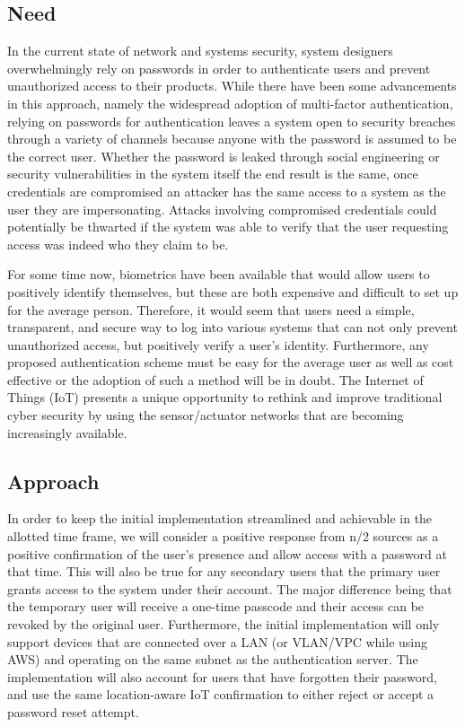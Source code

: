 \documentclass[11pt,journal]{IEEEtran}
\begin{document}
\subsection{Need}
In the current state of network and systems security, system designers overwhelmingly rely on passwords in order to authenticate users and prevent unauthorized access to their products.  While there have been some advancements in this approach, namely the widespread adoption of multi-factor authentication, relying on passwords for authentication leaves a system open to security breaches through a variety of channels because anyone with the password is assumed to be the correct user.  Whether the password is leaked through social engineering or security vulnerabilities in the system itself the end result is the same, once credentials are compromised an attacker has the same access to a system as the user they are impersonating.  Attacks involving compromised credentials could potentially be thwarted if the system was able to verify that the user requesting access was indeed who they claim to be.

For some time now, biometrics have been available that would allow users to positively identify themselves, but these are both expensive and difficult to set up for the average person.  
Therefore, it would seem that users need a simple, transparent, and secure way to log into various systems that can not only prevent unauthorized access, but positively verify a user’s identity.  Furthermore, any proposed authentication scheme must be easy for the average user as well as cost effective or the adoption of such a method will be in doubt.  The Internet of Things (IoT) presents a unique opportunity to rethink and improve traditional cyber security by using the sensor/actuator networks that are becoming increasingly available.

\subsection{Approach}
In order to keep the initial implementation streamlined and achievable in the allotted time frame, we will consider a positive response from n/2 sources as a positive confirmation of the user’s presence and allow access with a password at that time.   This will also be true for any secondary users that the primary user grants access to the system under their account.  The major difference being that the temporary user will receive a one-time passcode and their access can be revoked by the original user.  Furthermore, the initial implementation will only support devices that are connected over a LAN (or VLAN/VPC while using AWS) and operating on the same subnet as the authentication server.  The implementation will also account for users that have forgotten their password, and use the same location-aware IoT confirmation to either reject or accept a password reset attempt.
\end{document}
